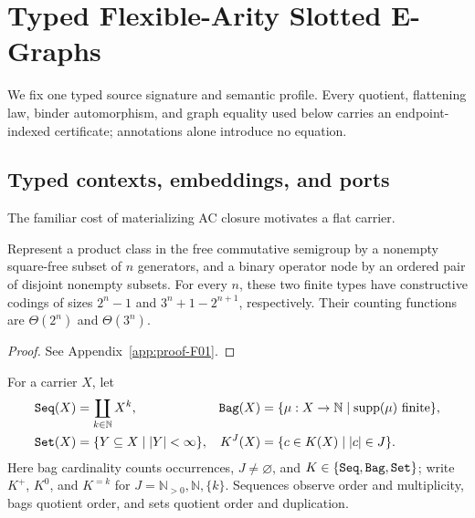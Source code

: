 \section{Typed Flexible-Arity Slotted E-Graphs}
\label{sec:formalism}

We fix one typed source signature and semantic profile.  Every quotient,
flattening law, binder automorphism, and graph equality used below carries an
endpoint-indexed certificate; annotations alone introduce no equation.

\subsection{Typed contexts, embeddings, and ports}

The familiar cost of materializing AC closure motivates a flat carrier.
\begin{lemma}
\label{res:F01}
Represent a product class in the free commutative semigroup by a nonempty
square-free subset of $n$ generators, and a binary operator node by an ordered
pair of disjoint nonempty subsets.  For every $n$, these two finite types have
constructive codings of sizes $2^n-1$ and $3^n+1-2^{n+1}$, respectively.
Their counting functions are $\Theta(2^n)$ and $\Theta(3^n)$.
\end{lemma}
\begin{proof}See Appendix~\ref{app:proof-F01}.\end{proof}

For a carrier $X$, let
\begin{align*}
\texttt{Seq}(X)&=\coprod_{k\in\mathbb N}X^k,&
\texttt{Bag}(X)&=\{\mu:X\to\mathbb N\mid\operatorname{supp}(\mu)\text{ finite}\},\\
\texttt{Set}(X)&=\{Y\subseteq X\mid |Y|<\infty\},&
K^J(X)&=\{c\in K(X)\mid |c|\in J\}.
\end{align*}
Here bag cardinality counts occurrences, $J\ne\varnothing$, and
$K\in\{\texttt{Seq},\texttt{Bag},\texttt{Set}\}$; write $K^+$, $K^0$, and $K^{=k}$ for
$J=\mathbb N_{>0},\mathbb N,\{k\}$.  Sequences observe order and
multiplicity, bags quotient order, and sets quotient order and duplication.


